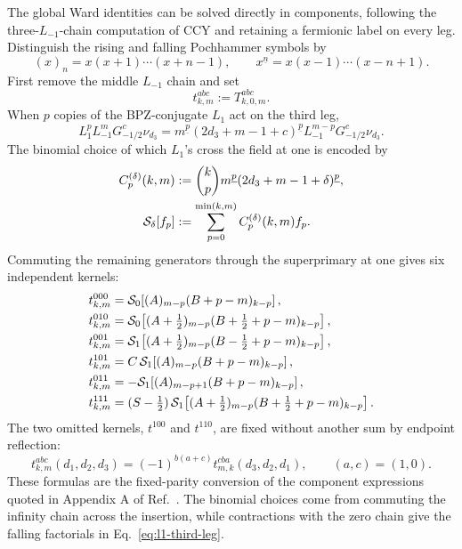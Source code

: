 \documentclass[11pt]{article}
\newcommand{\half}{\tfrac12}
\begin{document}
The global Ward identities can be solved directly in components, following
the three-\(L_{-1}\)-chain computation of CCY and retaining a fermionic
label on every leg.
Distinguish the rising and falling
Pochhammer symbols by
\begin{equation}
 (x)_n=x(x+1)\cdots(x+n-1),
 \qquad
 x^{\underline n}=x(x-1)\cdots(x-n+1).
 \label{eq:two-pochhammers}
\end{equation}
First remove the middle \(L_{-1}\) chain and set
\begin{equation}
 t_{k,m}^{abc}:=T_{k,0,m}^{abc}.
 \label{eq:reduced-global-kernel}
\end{equation}
When \(p\) copies of the BPZ-conjugate \(L_1\) act on the third leg,
\begin{equation}
 L_1^p L_{-1}^{m}G_{-1/2}^{c}\nu_{d_3}
 =m^{\underline p}
  (2d_3+m-1+c)^{\underline p}
  L_{-1}^{m-p}G_{-1/2}^{c}\nu_{d_3}.
 \label{eq:l1-third-leg}
\end{equation}
The binomial choice of which \(L_1\)'s cross the field at one is encoded by
\begin{align}
 C_p^{(\delta)}(k,m)
 &:=\binom{k}{p}m^{\underline p}
  (2d_3+m-1+\delta)^{\underline p},
 \notag\\
 \mathcal S_\delta[f_p]
 &:=\sum_{p=0}^{\min(k,m)}C_p^{(\delta)}(k,m)f_p.
 \label{eq:global-sum-operator}
\end{align}
Commuting the remaining generators through the superprimary at one gives six
independent kernels:
\begin{align}
 t_{k,m}^{000}
 &=\mathcal S_0\!\left[(A)_{m-p}(B+p-m)_{k-p}\right],
 \notag\\
 t_{k,m}^{010}
 &=\mathcal S_0\!\left[(A+\half)_{m-p}
                    (B+\half+p-m)_{k-p}\right],
 \notag\\
 t_{k,m}^{001}
 &=\mathcal S_1\!\left[(A+\half)_{m-p}
                    (B-\half+p-m)_{k-p}\right],
 \notag\\
 t_{k,m}^{101}
 &=C\,\mathcal S_1\!\left[(A)_{m-p}
                    (B+p-m)_{k-p}\right],
 \notag\\
 t_{k,m}^{011}
 &=-\mathcal S_1\!\left[(A)_{m-p+1}
                    (B+p-m)_{k-p}\right],
 \notag\\
 t_{k,m}^{111}
 &=(S-\half)\,\mathcal S_1\!\left[(A+\half)_{m-p}
                    (B+\half+p-m)_{k-p}\right].
 \label{eq:eight-global-kernels}
\end{align}
The two omitted kernels, \(t^{100}\) and \(t^{110}\), are fixed without
another sum by endpoint reflection:
\begin{equation}
 \boxed{
 t_{k,m}^{abc}(d_1,d_2,d_3)
 =(-1)^{b(a+c)}
  t_{m,k}^{cba}(d_3,d_2,d_1),
 \qquad (a,c)=(1,0).}
 \label{eq:projected-global-reflection}
\end{equation}
These formulas are the fixed-parity conversion of the component expressions
quoted in Appendix A of Ref.~\cite{BelavinGeiko2018CRecursion}.  The
binomial choices come from commuting the infinity chain across the insertion,
while contractions with the zero chain give the falling factorials in
Eq.~\eqref{eq:l1-third-leg}.
\end{document}
